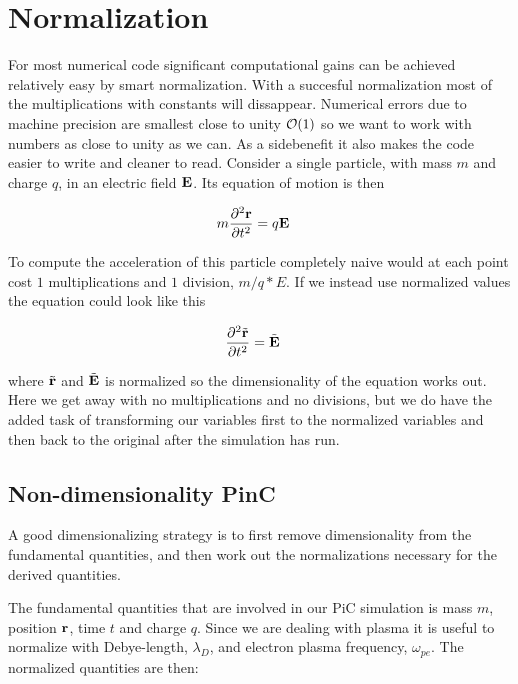 \section{Normalization}
    For most numerical code significant computational gains can be achieved
    relatively easy by smart normalization. With a succesful normalization most
    of the multiplications with constants will dissappear. Numerical errors
    due to machine precision are smallest close to unity \(\order{1}\) \citep{hjorth-jensen_computational_????} so we
    want to work with numbers as close to unity as we can. As a sidebenefit it also
    makes the code easier to write and cleaner to read. Consider a single particle,
    with mass \(m\) and charge \(q\), in an electric field \(\vb{E}\). Its equation of motion is then

    \begin{align}
        m\pdv[2]{\vb{r}}{t} &= q\vb{E}
    \end{align}

    To compute the acceleration of this particle completely naive would at each point
    cost \(1\) multiplications and \(1\) division, \(m/q*E\). If we instead use normalized
    values the equation could look like this

    \begin{align}
        \pdv[2]{\tilde {\vb{r}}}{t} &= \tilde{\vb{E}}
    \end{align}

    where \(\tilde {\vb{r}}\) and \(\tilde{\vb{E}}\) is normalized so the dimensionality of the
    equation works out. Here we get away with no multiplications and no divisions,
    but we do have the added task of transforming our variables first to the normalized variables
    and then back to the original after the simulation has run.

    \subsection{Non-dimensionality PinC}
        A good dimensionalizing strategy is to first remove
        dimensionality from the fundamental quantities, and then work out the
        normalizations necessary for the derived quantities.

        The fundamental quantities that are involved in our PiC simulation is
        mass \(m\), position \(\vb{r}\), time \(t\) and charge \(q\). Since we are dealing with
        plasma it is useful to normalize with Debye-length, \(\lambda_D\), and electron plasma frequency, \(\omega_{pe}\).
        The normalized quantities are then:

